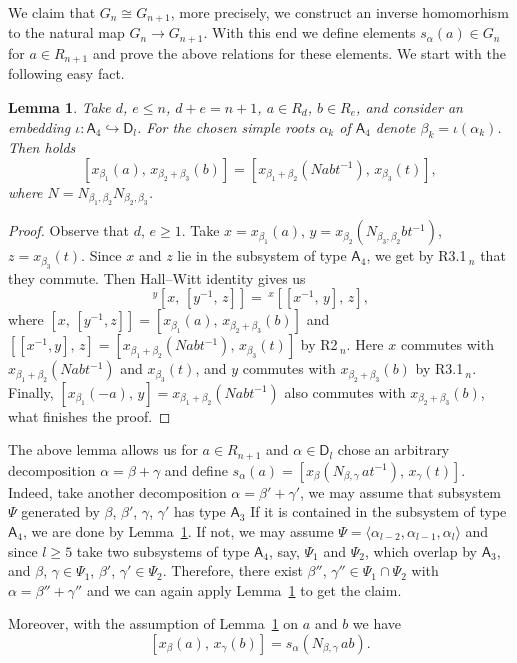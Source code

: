 \documentclass[oneside, 8pt]{amsart}
\newtheorem{lemma}{Lemma}
\theoremstyle{remark}
\theoremstyle{definition}
\newcommand{\inv}{^{-1}}
\newcommand{\rA}{\mathsf{A}}
\newcommand{\rD}{\mathsf{D}}
\numberwithin{equation}{section}
\begin{document}
We claim that $G_n\cong G_{n+1}$, more precisely, we construct an inverse homomorhism to the natural map $G_n\rightarrow G_{n+1}$. With this end we define elements $s_\alpha(a)\in G_n$ for $a\in R_{n+1}$ and prove the above relations for these elements. We start with the following easy fact.

\begin{lemma}
\label{welldef}
Take $d$, $e\leq n$, $d+e=n+1$, $a\in R_d$, $b\in R_e$, and consider an embedding $\iota\colon\rA_4\hookrightarrow\rD_l$. For the chosen simple roots $\alpha_k$ of $\rA_4$ denote $\beta_k=\iota(\alpha_k)$. Then holds
$$
[x_{\beta_1}(a),\,x_{\beta_2+\beta_3}(b)]=[x_{\beta_1+\beta_2}(Nabt\inv),\,x_{\beta_3}(t)],
$$
where $N=N_{\beta_1,\beta_2}N_{\beta_2,\beta_3}$.
\end{lemma}
\begin{proof}
Observe that $d$, $e\geq1$. Take $x=x_{\beta_1}(a)$, $y=x_{\beta_2}(N_{\beta_3,\beta_2}bt\inv)$, $z=x_{\beta_3}(t)$. Since $x$ and $z$ lie in the subsystem of type $\rA_4$, we get by R3.1$\!\,_n$ that they commute. Then Hall--Witt identity gives us
$$
\,^y[x,\,[y\inv,\,z]]=\,^x[[x\inv,\,y],\,z],
$$
where $[x,\,[y\inv,z]]=[x_{\beta_1}(a),\,x_{\beta_2+\beta_3}(b)]$ and $[[x\inv,y],\,z]=[x_{\beta_1+\beta_2}(Nabt\inv),\,x_{\beta_3}(t)]$ by R2$\!\,_n$. Here $x$ commutes with $x_{\beta_1+\beta_2}(Nabt\inv)$ and $x_{\beta_3}(t)$, and $y$ commutes with $x_{\beta_2+\beta_3}(b)$ by R3.1$\!\,_n$. Finally, $[x_{\beta_1}(-a),\,y]=x_{\beta_1+\beta_2}(Nabt\inv)$ also commutes with $x_{\beta_2+\beta_3}(b)$, what finishes the proof.
\end{proof}

The above lemma allows us for $a\in R_{n+1}$ and $\alpha\in\rD_l$ chose an arbitrary decomposition $\alpha=\beta+\gamma$ and define $s_\alpha(a)=[x_\beta(N_{\beta,\gamma}\,at\inv),\,x_\gamma(t)]$. Indeed, take another decomposition $\alpha=\beta'+\gamma'$, we may assume that subsystem $\Psi$ generated by $\beta$, $\beta'$, $\gamma$, $\gamma'$ has type $\rA_3$ If it is contained in the subsystem of type $\rA_4$, we are done by Lemma~\ref{welldef}. If not, we may assume $\Psi=\langle\alpha_{l-2},\alpha_{l-1},\alpha_l\rangle$ and since $l\geq5$ take two subsystems of type $\rA_4$, say, $\Psi_1$ and $\Psi_2$, which overlap by $\rA_3$, and $\beta$, $\gamma\in\Psi_1$, $\beta'$, $\gamma'\in\Psi_2$. Therefore, there exist $\beta''$, $\gamma''\in\Psi_1\cap\Psi_2$ with $\alpha=\beta''+\gamma''$ and we can again apply Lemma~\ref{welldef} to get the claim. 

Moreover, with the assumption of Lemma~\ref{welldef} on $a$ and $b$ we have
$$
[x_{\beta}(a),\,x_{\gamma}(b)]=s_{\alpha}(N_{\beta,\gamma}\,ab).
$$
\end{document}
